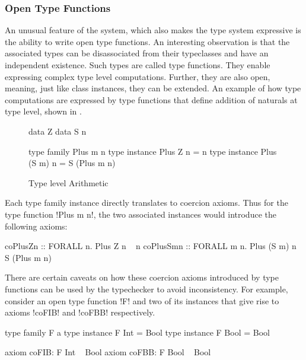 \documentclass[screen,nonacm,manuscript,review]{acmart} %
\begin{document}
\subsubsection{Open Type Functions}\label{sec:fc-encodes-opentypefun}
An unusual feature of the system, which also makes the type system
expressive is the ability to write open type functions.
An interesting observation is that the associated types can be
disassociated from their typeclasses and have an independent
existence. Such types are called type functions. They enable
expressing complex type level computations. Further, they are also
open, meaning, just like class instances, they can be extended. An
example of how type computations are expressed by type functions that
define addition of naturals at type level, shown in .
\begin{figure}[ht]
\begin{minipage}[ht]{0.4\linewidth}
\begin{code}
data Z
data S n
\end{code}
\end{minipage}%
\begin{minipage}[ht]{0.4\linewidth}
\begin{code}
type family Plus m n
type instance Plus Z n = n
type instance Plus (S m) n = S (Plus m n)
\end{code}
\end{minipage}
\caption{Type level Arithmetic}
\label{fig:open-type-fun-add}
\end{figure}

Each type family instance directly translates to coercion axioms.
Thus for the type function !Plus m n!, the two associated instances
would introduce the following axioms:

\begin{CenteredBox}
\begin{code}
coPlusZn :: FORALL n. Plus Z n ~ n
coPlusSmn :: FORALL m n. Plus (S m) n ~ S (Plus m n)
\end{code}
\end{CenteredBox}

There are certain caveats on how these coercion axioms introduced by
type functions can be used by the typechecker to avoid inconsistency.
For example, consider an open type function !F! and two
of its instances that give rise to axioms !coFIB! and !coFBB! respectively.

\begin{minipage}[ht]{0.5\linewidth}
\begin{code}
            type family F a
            type instance F Int = Bool
            type instance F Bool = Bool
\end{code}
\end{minipage}%
\begin{minipage}[ht]{0.5\linewidth}
\begin{code}
      axiom coFIB: F Int ~ Bool
      axiom coFBB: F Bool ~ Bool
\end{code}
\end{minipage}
\end{document}

